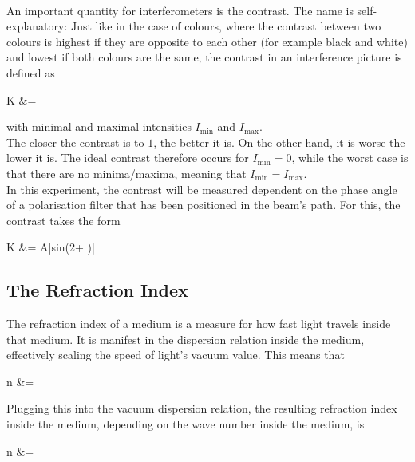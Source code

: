 \\
An important quantity for interferometers is the contrast. The name is self-explanatory: Just like in the case of colours, where the contrast between two colours is highest if they are opposite to each other (for example black and white) and lowest if both colours are the same, the contrast in an interference picture is defined as 
\begin{aquation}
  K &=  \tc
\end{aquation}
with minimal and maximal intensities $I_\text{min}$ and $I_\text{max}$.\\
The closer the contrast is to $1$, the better it is. On the other hand, it is worse the lower it is. The ideal contrast therefore occurs for $I_\text{min}=0$, while the worst case is that there are no minima/maxima, meaning that $I_\text{min}=I_\text{max}$.\\
In this experiment, the contrast will be measured dependent on the phase angle of a polarisation filter that has been positioned in the beam's path. For this, the contrast takes the form 
\begin{aquation}
K &= A|sin(2\varphi + \delta)| \tp
\end{aquation}

\subsection{The Refraction Index}
The refraction index of a medium is a measure for how fast light travels inside that medium. It is manifest in the dispersion relation inside the medium, effectively scaling the speed of light's vacuum value. This means that 
\begin{aquation}
  n &=  \tp 
\end{aquation}
Plugging this into the vacuum dispersion relation, the resulting refraction index inside the medium, depending on the wave number inside the medium, is
\begin{aquation}
  n &=  \tp
\end{aquation}
